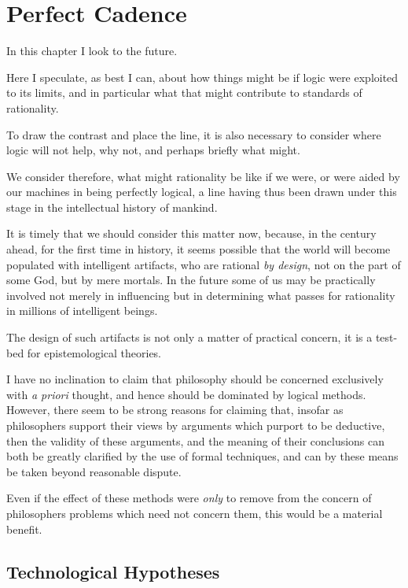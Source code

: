 \chapter{Perfect Cadence}\label{PerfectCadence}

In this chapter I look to the future.

Here I speculate, as best I can, about how things might be if logic were exploited to its limits, and in particular what that might contribute to standards of rationality.

To draw the contrast and place the line, it is also necessary to consider where logic will not help, why not, and perhaps briefly what might.

We consider therefore, what might rationality be like if we were, or were aided by our machines in being perfectly logical, a line having thus been drawn under this stage in the intellectual history of mankind.

It is timely that we should consider this matter now, because, in the century ahead, for the first time in history, it seems possible that the world will become populated with intelligent artifacts, who are rational {\it by design}, not on the part of some God, but by mere mortals.
In the future some of us may be practically involved not merely in influencing but in determining what passes for rationality in millions of intelligent beings.

The design of such artifacts is not only a matter of practical concern, it is a test-bed for epistemological theories.

I have no inclination to claim that philosophy should be concerned exclusively with {\it a priori} thought, and hence should be dominated by logical methods.
However, there seem to be strong reasons for claiming that, insofar as philosophers support their views by arguments which purport to be deductive, then the validity of these arguments, and the meaning of their conclusions can both be greatly clarified by the use of formal techniques, and can by these means be taken beyond reasonable dispute.

Even if the effect of these methods were {\it only} to remove from the concern of philosophers problems which need not concern them, this would be a material benefit.

\section{Technological Hypotheses}

